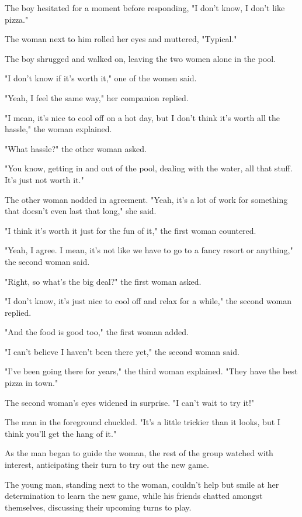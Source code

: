 \documentclass[smalldemyvopaper,11pt,twoside,onecolumn,openright,extrafontsizes]{memoir}
\begin{document}
The boy hesitated for a moment before responding, "I don't know, I don't like pizza."\par
The woman next to him rolled her eyes and muttered, "Typical."\par
The boy shrugged and walked on, leaving the two women alone in the pool.\par
"I don't know if it's worth it," one of the women said.\par
"Yeah, I feel the same way," her companion replied.\par
"I mean, it's nice to cool off on a hot day, but I don't think it's worth all the hassle," the woman explained.\par
"What hassle?" the other woman asked.\par
"You know, getting in and out of the pool, dealing with the water, all that stuff. It's just not worth it."\par
The other woman nodded in agreement. "Yeah, it's a lot of work for something that doesn't even last that long," she said.\par
"I think it's worth it just for the fun of it," the first woman countered.\par
"Yeah, I agree. I mean, it's not like we have to go to a fancy resort or anything," the second woman said.\par
"Right, so what's the big deal?" the first woman asked.\par
"I don't know, it's just nice to cool off and relax for a while," the second woman replied.\par
"And the food is good too," the first woman added.\par
"I can't believe I haven't been there yet," the second woman said.\par
"I've been going there for years," the third woman explained. "They have the best pizza in town."\par
The second woman's eyes widened in surprise. "I can't wait to try it!"\par
The man in the foreground chuckled. "It's a little trickier than it looks, but I think you'll get the hang of it."\par
As the man began to guide the woman, the rest of the group watched with interest, anticipating their turn to try out the new game.\par
The young man, standing next to the woman, couldn't help but smile at her determination to learn the new game, while his friends chatted amongst themselves, discussing their upcoming turns to play.\par
\end{document}
